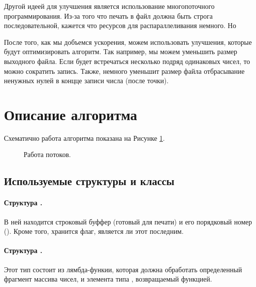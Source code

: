 \documentclass[specialist,subf,href,colorlinks=true,14pt
,times,mtpro,specialist
]{disser}
\begin{document}
Другой идеей для улучшения является использование многопоточного программирования. 
Из-за того что печать в файл должна быть строга последовательной, кажется что ресурсов для распараллеливания немного.
Но

После того, как мы добъемся ускорения, можем использовать улучшения, которые будут оптимизировать алгоритм. 
Так например, мы можем уменьшить размер выходного файла.
Если будет встречаться несколько подряд одинаковых чисел, то можно сократить запись.
Также, немного уменьшит размер файла отбрасывание ненужных нулей в концце записи числа (после точки).


\section{Описание алгоритма}
Схематично работа алгоритма показана на Рисунке \ref{draw}.
\begin{figure}[h!]
\begin{footnotesize}
\def\svgwidth{430pt}
  
  \caption{Работа потоков.} \label{draw}
\end{footnotesize}\end{figure}

\subsection{Используемые структуры и классы}
\paragraph{Структура \texttt{}.}
В ней находится строковый буффер (готовый для печати) и его порядковый номер (\texttt{}).
Кроме того, хранится флаг, является ли этот \texttt{} последним.
\paragraph{Структура \texttt{}.}
Этот тип состоит из лямбда-функии, которая должна обработать определенный фрагмент массива чисел, и элемента типа \texttt{}, возвращаемый функцией.
\end{document}
